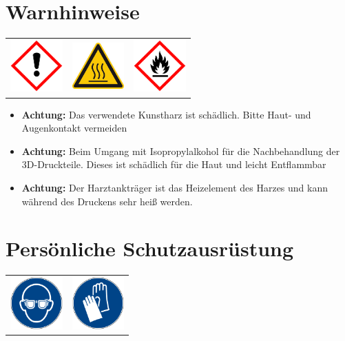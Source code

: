 \documentclass{\basedir/fablab-document}
\begin{document}
\section{Warnhinweise}
\begin{table}[h]
	\centering
	\begin{tabular}{ccc}
		
		\includegraphics[width=2cm]{bilder/GHSa.png}  &
		\includegraphics[width=2cm]{bilder/GHShs.jpg}  & \includegraphics[width=2cm]{bilder/GHSf.png} \\
	\end{tabular}
\end{table}

\begin{itemize}
	\item \textbf{Achtung:} Das verwendete Kunstharz ist schädlich. Bitte Haut- und Augenkontakt vermeiden \\
	\item \textbf{Achtung:} Beim Umgang mit Isopropylalkohol für die Nachbehandlung der 3D-Druckteile. Dieses ist schädlich für die Haut und leicht Entflammbar\\
	
	\item \textbf{Achtung:} Der Harztankträger ist das Heizelement des Harzes und kann während des Druckens sehr heiß werden.
\end{itemize}

\section{Persönliche Schutzausrüstung}
\begin{table}[h]
	\centering
	\begin{tabular}{cc}
		
	 \includegraphics[width=2cm]{bilder/gaugenschutz.png}  & \includegraphics[width=2cm]{bilder/ghandschuh.png} \\
	\end{tabular}
\end{table}
\end{document}
